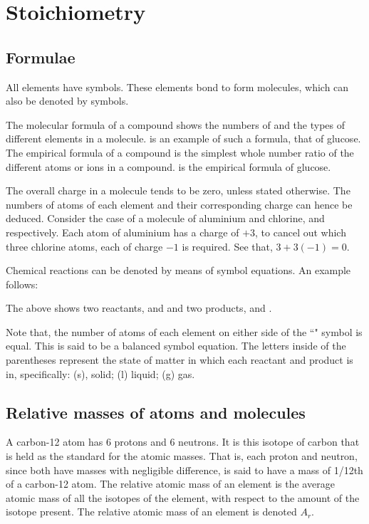 \section{Stoichiometry}
\subsection{Formulae}

All elements have symbols. These elements bond to form molecules, which can also be denoted by
symbols. 

The molecular formula of a compound shows the numbers of and the types of different
elements in a molecule.  is an example of such a formula, that of glucose. 
The empirical formula of a compound is the simplest whole number ratio of the different atoms or
ions in a compound.  is the empirical formula of glucose.

The overall charge in a molecule tends to be zero, unless stated otherwise. The numbers of atoms
of each element and their corresponding charge can hence be deduced. Consider the case of a 
molecule of aluminium and chlorine,  and  respectively. Each atom of aluminium
has a charge of $+3$, to cancel out which three chlorine atoms, each of charge $-1$ is required.
See that, $3 + 3(-1) = 0$.

Chemical reactions can be denoted by means of symbol equations. An example follows:
\begin{center}
\end{center}
The above shows two reactants,  and  and two products,  and .

Note that, the number of atoms of each element on either side of the ``\ce{->}" symbol is equal.
This is said to be a balanced symbol equation. The letters inside of the parentheses represent the
state of matter in which each reactant and product is in, specifically: (s), solid; (l) liquid;
(g) gas.

\subsection{Relative masses of atoms and molecules}

A carbon-12 atom has 6 protons and 6 neutrons. It is this isotope of carbon that is held as the
standard for the atomic masses. That is, each proton and neutron, since both have masses with
negligible difference, is said to have a mass of 1/12th of a carbon-12 atom. The relative atomic
mass of an element is the average atomic mass of all the isotopes of the element, with respect to
the amount of the isotope present. The relative atomic mass of an element is denoted $A_r$.

